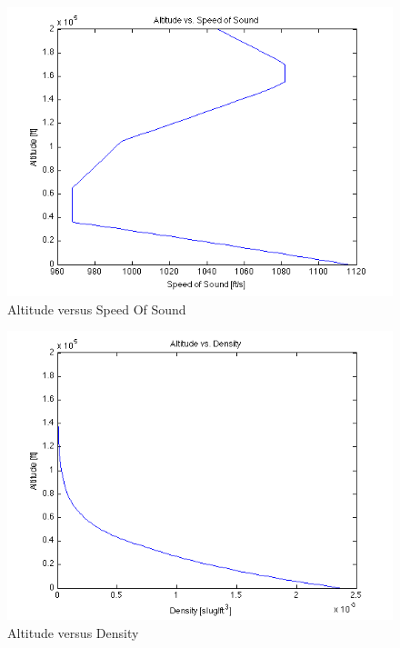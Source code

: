 \documentclass[12pt]{report}
\begin{document}
\begin{figure}[here]
\includegraphics[width=1\textwidth]{AltitudeVsSpeedOfSound.png}
\caption{Altitude versus Speed Of Sound}
\label{fig:Figure3}
\end{figure}

\begin{figure}[here]
\includegraphics[width=1\textwidth]{AltitudeVsDensity.png}
\caption{Altitude versus Density}
\label{fig:Figure4}
\end{figure}
\end{document}
